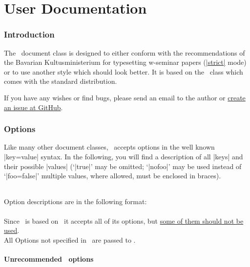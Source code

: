 \part{User Documentation}


\section{Introduction}

The \wsemclassic\ document class is designed to either conform with the
recommendations of the Bavarian Kultusministerium for typesetting
w-seminar papers (\hyperlink{udoc.opt.strict}{|strict|} mode) or to use another
style which should look better. It is based on the \report\ class which
comes with the standard  distribution.

If you have any wishes or find bugs, please send an email to the author or
\href{https://github.com/jorsn/wsemclassic/issues}{create an issue at GitHub}.

\hypertarget{sec.options}{\section{Options}}

Like many other  document classes, \wsemclassic\ accepts options in
the well known |key=value| syntax. In the following, you will find a
description of all |keys| and their possible |values|
(`|true|' may be omitted; `|nofoo|' may be used instead of `|foo=false|' multiple
values, where allowed, must be enclosed in braces).

\noindent\\ Option descriptions are in the following format:\\

 \\


\noindent
Since \wsemclassic\ is based on \report\ it accepts all of its options, but
\hyperlink{subsubsec.unrecomm}{some of them should not be used}.\\

\noindent
All Options not specified in \wsemclassic\ are passed to \report.

\hypertarget{subsubsec.unrecomm}{\subsection{Unrecommended \report\ options}}

